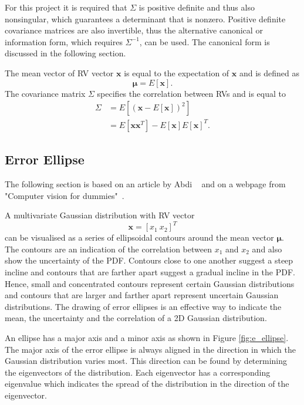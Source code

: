 \documentclass[12pt,oneside,openany,a4paper, %
afrikaans,english,
]{memoir}
\numberwithin{equation}{chapter}
\begin{document}
For this project it is required that $\Sigma$ is positive definite and thus also nonsingular, which guarantees a determinant that is nonzero. Positive definite covariance matrices are also invertible, thus the alternative canonical or information form, which requires $\Sigma^{-1}$, can be used. The canonical form is discussed in the following section.

The mean vector of RV vector $\bm{x}$ is equal to the expectation of $\bm{x}$ and is defined as
\begin{equation}
\bm{\mu} = E[\bm{x}].
\end{equation}
The covariance matrix $\Sigma$ specifies the correlation between RVs and is equal to
\begin{equation}\label{eq:defCovariance}
\begin{split}
\Sigma & = E\left[(\bm{x} - E[\bm{x}])^2\right]\\
& = E[\bm{xx}^T] - E[\bm{x}]E[\bm{x}]^T.
\end{split}
\end{equation}
\subsection{Error Ellipse}The following section is based on an article by Abdi ~\cite{abdi} and on a webpage from "Computer vision for dummies"~\cite{draw_ellipse}.

A multivariate Gaussian distribution with RV vector
\begin{equation}
\bm{x} = [x_1\ x_2]^T
\end{equation}
can be visualised as a series of ellipsoidal contours around the mean vector $\bm{\mu}$. The contours are an indication of the correlation between $x_1$ and $x_2$ and also show the uncertainty of the PDF. Contours close to one another suggest a steep incline and contours that are farther apart suggest a gradual incline in the PDF. Hence, small and concentrated contours represent certain Gaussian distributions and contours that are larger and farther apart represent uncertain Gaussian distributions. The drawing of error ellipses is an effective way to indicate the mean, the uncertainty and the correlation of a 2D Gaussian distribution.

An ellipse has a major axis and a minor axis as shown in Figure \ref{fig:e_ellipse}. The major axis of the error ellipse is always aligned in the direction in which the Gaussian distribution varies most. This direction can be found by determining the eigenvectors of the distribution. Each eigenvector has a corresponding eigenvalue which indicates the spread of the distribution in the direction of the eigenvector. 
\end{document}
